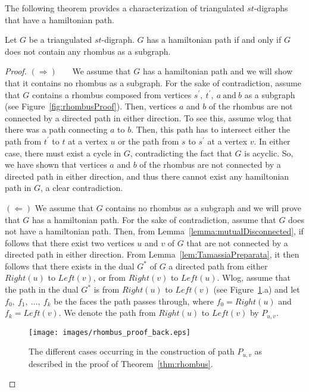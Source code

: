 \documentclass{myllncs-mixalis}
\begin{document}
 The following theorem provides a characterization of
triangulated $st$-digraphs that have a hamiltonian path.


\begin{theorem}
\label{thm:rhombus}
Let $G$ be a triangulated $st$-digraph. $G$ has a hamiltonian path
if and only if $G$ does not contain any rhombus as a subgraph.
\end{theorem}

\begin{proof}

$(\Rightarrow)$~~~  We assume that $G$ has a hamiltonian path and we
will show that it contains no rhombus as a subgraph. For the sake of
contradiction,  assume that $G$ contains a rhombus composed from
vertices $s^\prime, ~t^\prime, ~a~ \mbox{and}~ b$ as a subgraph (see
Figure~\ref{fig:rhombusProof}). Then, vertices $a$ and $b$  of the
rhombus are not connected by a directed path in either direction. To
see this, assume wlog that there was a path connecting $a$ to $b$.
Then, this path has to intersect either the path from $t^\prime$ to
$t$ at a vertex $u$ or the path from $s$  to $s^\prime$ at a vertex
$v$. In either case, there must exist a cycle in $G$, contradicting
the fact that $G$ is acyclic. So, we have shown that vertices $a$
and $b$ of the rhombus are not connected  by a directed path in
either direction, and thus there cannot exist any hamiltonian path
in $G$, a clear contradiction.


$(\Leftarrow)$ We assume that $G$ contains no rhombus as a subgraph
and we will prove that $G$ has a hamiltonian path. For the sake of
contradiction, assume that $G$ does not have a hamiltonian path.
Then, from Lemma~\ref{lemma:mutualDisconnected}, if follows that
there exist two vertices $u$ and $v$ of $G$ that are not connected
by a directed path in either direction. From
Lemma~\ref{lem:TamassiaPreparata}, it then follows that there exists
in the dual $G^*$ of $G$ a directed path from either $Right(u)$ to
$Left(v)$, or from $Right(v)$ to $Left(u)$. Wlog, assume that the
path in the dual $G^*$ is from $Right(u)$ to $Left(v)$  (see
Figure~\ref{fig:rhombusProofBack}.a) and let $f_0, ~f_1, ~\ldots,
~f_k$ be the faces the path passes through, where $f_0=Right(u)$ and
$f_k=Left(v)$. We denote the path from $Right(u)$ to $Left(v)$ by
$P_{u,v}$.

\begin{figure}[tb]
    \begin{minipage}{\textwidth}
    \centering
    \texttt{[image: images/rhombus\_proof\_back.eps]}
    \caption{The different cases occurring in  the construction of path $P_{u,v}$ as described in
    the proof of Theorem~\ref{thm:rhombus}.}
    \label{fig:rhombusProofBack}
  \end{minipage}
\end{figure}


\end{proof}
\end{document}
